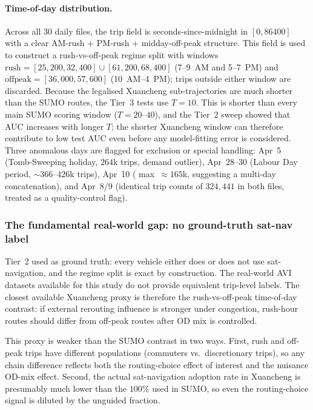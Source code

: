 \paragraph{Time-of-day distribution.} Across all $30$ daily files, the
trip  field is seconds-since-midnight in $[0, 86400]$
with a clear AM-rush + PM-rush + midday-off-peak structure. This field is
used to construct a rush-vs-off-peak regime split with windows
$\text{rush} = [25{,}200, 32{,}400] \cup [61{,}200, 68{,}400]$
(7--9~AM and 5--7~PM) and
$\text{offpeak} = [36{,}000, 57{,}600]$ (10~AM--4~PM); trips outside
either window are discarded. Because the legalised Xuancheng
sub-trajectories are much shorter than the SUMO routes, the Tier~3 tests
use $T=10$. This is shorter than every main SUMO scoring window
($T=20$--$40$), and the Tier~2 sweep showed that AUC increases with
longer $T$; the shorter Xuancheng window can therefore contribute to low
test AUC even before any model-fitting error is considered. Three
anomalous days are flagged for exclusion or special handling:
Apr~5 (Tomb-Sweeping holiday, $264$k trips, demand outlier), Apr~28--30
(Labour Day period, $\sim 366$--$426$k trips), Apr~10
( max~$\approx 165$k, suggesting a multi-day
concatenation), and Apr~8/9 (identical trip counts of $324{,}441$ in both
files, treated as a quality-control flag).

\subsubsection{The fundamental real-world gap: no ground-truth sat-nav label}
\label{sec:phase5-proxy}

Tier~2 used  as ground truth: every
vehicle either does or does not use sat-navigation, and the regime split
is exact by construction. The real-world AVI datasets available for this
study do not provide equivalent trip-level labels. The closest available
Xuancheng proxy is therefore the rush-vs-off-peak time-of-day contrast:
if external rerouting influence is stronger under congestion, rush-hour
routes should differ from off-peak routes after OD mix is controlled.

This proxy is weaker than the SUMO contrast in two ways. First, rush
and off-peak trips have different populations (commuters vs.\
discretionary trips), so any chain difference reflects both the
routing-choice effect of interest and the nuisance OD-mix effect.
Second, the actual sat-navigation adoption rate in
Xuancheng is presumably much lower than the $100\%$ used in SUMO, so
even the routing-choice signal is diluted by the unguided fraction.

